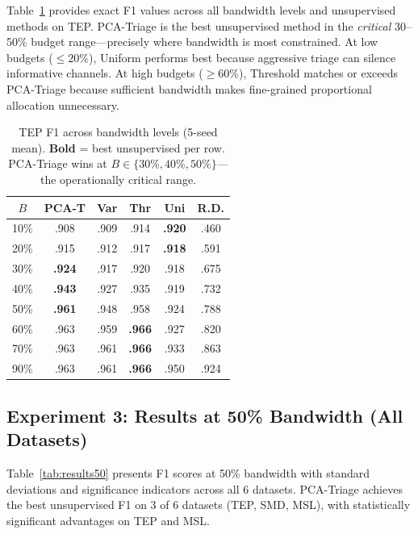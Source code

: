 \documentclass[journal]{IEEEtran}
\begin{document}
Table~\ref{tab:bw_sensitivity} provides exact F1 values across all bandwidth levels and unsupervised methods on TEP. PCA-Triage is the best unsupervised method in the \textit{critical} 30--50\% budget range---precisely where bandwidth is most constrained. At low budgets ($\leq 20\%$), Uniform performs best because aggressive triage can silence informative channels. At high budgets ($\geq 60\%$), Threshold matches or exceeds PCA-Triage because sufficient bandwidth makes fine-grained proportional allocation unnecessary.

\begin{table}[t]
\centering
\caption{TEP F1 across bandwidth levels (5-seed mean). \textbf{Bold} = best unsupervised per row. PCA-Triage wins at $B \in \{30\%, 40\%, 50\%\}$---the operationally critical range.}
\begin{tabular}{@{}cccccc@{}}
\toprule
$B$ & \textbf{PCA-T} & \textbf{Var} & \textbf{Thr} & \textbf{Uni} & \textbf{R.D.} \\
\midrule
10\% & .908 & .909 & .914 & \textbf{.920} & .460 \\
20\% & .915 & .912 & .917 & \textbf{.918} & .591 \\
30\% & \textbf{.924} & .917 & .920 & .918 & .675 \\
40\% & \textbf{.943} & .927 & .935 & .919 & .732 \\
50\% & \textbf{.961} & .948 & .958 & .924 & .788 \\
60\% & .963 & .959 & \textbf{.966} & .927 & .820 \\
70\% & .963 & .961 & \textbf{.966} & .933 & .863 \\
90\% & .963 & .961 & \textbf{.966} & .950 & .924 \\
\bottomrule
\end{tabular}
\label{tab:bw_sensitivity}
\end{table}

\subsection{Experiment 3: Results at 50\% Bandwidth (All Datasets)}

Table~\ref{tab:results50} presents F1 scores at 50\% bandwidth with standard deviations and significance indicators across all 6 datasets. PCA-Triage achieves the best unsupervised F1 on 3 of 6 datasets (TEP, SMD, MSL), with statistically significant advantages on TEP and MSL.
\end{document}
